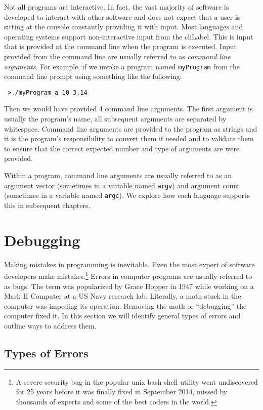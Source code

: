 Not all programs are interactive.  In fact, the vast majority of software is developed
to interact with other software and does not expect that a user is sitting at the console
constantly providing it with input.  Most languages and operating systems support 
non-interactive input from the \gls{cliLabel}.  This is input that is provided at the command
line when the program is executed.  Input provided from the command line are usually referred
to as \emph{command line arguments}.  For example, if we invoke a program named 
\texttt{myProgram} from the command line prompt using something like the following:

\texttt{~>./myProgram a 10 3.14}

Then we would have provided 4 command line arguments.  The first argument is usually
the program's name, all subsequent arguments are separated by whitespace.  Command
line arguments are provided to the program as strings and it is the program's responsibility
to convert them if needed and to validate them to ensure that the correct expected number
and type of arguments are were provided.

Within a program, command line arguments are usually referred to as an argument vector
(sometimes in a variable named \texttt{argv}) and argument count (sometimes
in a variable named \texttt{argc}).  We explore how each language supports this
in subsequent chapters.

\section{Debugging}

Making mistakes in programming is inevitable.  Even the most expert of software 
developers make mistakes.\footnote{A severe security bug in the popular unix 
bash shell utility went undiscovered for 25 years before it was finally 
fixed in September 2014, missed by thousands of experts and some of the
best coders in the world.}  Errors in computer programs are usually 
referred to as \glspl{bug}.  The term was popularized by Grace Hopper in 
1947 while working on a Mark II Computer at a US Navy research lab.  
Literally, a moth stuck in the computer was impeding its operation.  Removing
the moth or ``debugging'' the computer fixed it.  In this section we will identify general
types of errors and outline ways to address them.

\subsection{Types of Errors}

